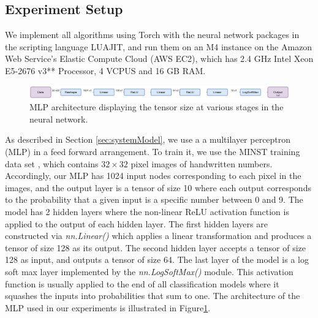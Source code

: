 \documentclass[conference]{IEEEtran}
\begin{document}
\subsection{Experiment Setup}
We implement all algorithms using Torch with the neural network packages in the scripting language LUAJIT, and run them on an M4
instance on the Amazon Web Service's Elastic Compute Cloud (AWS EC2), which has
2.4 GHz Intel Xeon E5-2676 v3** Processor, 4 VCPUS and 16 GB RAM.
\begin{figure}[t]
\centering
\includegraphics[width = 2 \columnwidth, keepaspectratio]{MLPArchitecture}
\caption{MLP architecture displaying the tensor size at various stages in the neural network. }
\label{fig:MLPArch}
\end{figure}
As described in Section \ref{sec:systemModel}, we use a 
a multilayer perceptron (MLP) in a feed forward arrangement. To train it, we use the MINST training data set \cite{deng2012mnist}, which contains 
$32\times 32$ pixel images of handwritten numbers. Accordingly, our MLP has 1024 input nodes
corresponding to each pixel in the images, and the output layer is a tensor of size 10 where each output corresponds to the probability
that a given input is a specific number
between 0 and 9.  The model has 2 hidden layers where the non-linear ReLU activation function is applied to the
output of each hidden layer.  The first hidden layers are constructed via \textit{nn.Linear()} which applies a linear transformation
and produces a tensor of size 128 as its output. The second hidden layer accepts a tensor of size 128 as input, and outputs a tensor of
size 64. The last layer of the model is a log soft max layer implemented by the \textit{nn.LogSoftMax()} module.  This activation
function is usually applied to the end of all classification models where it squashes the inputs into probabilities that sum to one.
The architecture of the MLP used in our experiments is illustrated in Figure\ref{fig:MLPArch}.



\end{document}
